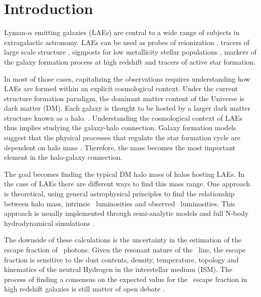 \documentclass{emulateapj}
\newcommand{\ly}{{\ifmmode{{\rm Ly}\alpha}\else{Ly$\alpha$}\fi}}
\begin{document}
\section{Introduction}
\label{sec:introduction}

Lyman-$\alpha$ emitting galaxies (LAEs) are central to a wide range
of subjects in extragalactic astronomy. 
LAEs can be used as probes of reionization \citep[for a recent review
  see][and references therein]{Dijkstra14}, tracers  of large scale structure
\citep{Koehler2007}, signposts for low metallicity stellar
populations \citep[for a recent review see][and references
  therein]{Hayes15}, markers of the galaxy formation process at high
redshift \citep{Partridge67,Rhoads00,Blanc11} and tracers of active
star formation.    

In most of those cases, capitalizing the observations requires
understanding how LAEs are formed within an explicit cosmological
context.  
Under the current structure formation paradigm, the dominant matter
content of the Universe is dark matter (DM).  
Each galaxy is thought to be hosted by a larger dark matter structure
known as a halo. \citep{Peebles1980,SpringelNature05}.  
Understanding the cosmological context of LAEs thus implies studying
the galaxy-halo connection.  
Galaxy formation models suggest that the physical processes that
regulate the star formation cycle are dependent on halo mass
\citep[e.g.][]{Behroozi2013a}. Therefore, the mass becomes 
the most important element in the halo-galaxy connection.  

The goal becomes finding the typical DM halo mass of halos hosting LAEs.
In the case of LAEs there are different ways to find this mass range.
One approach is theoretical, using general astrophysical principles to
find the relationship between halo mass, intrinsic \ly\ luminosities
and observed \ly\ luminosities. 
This approach is usually implemented through semi-analytic models
\citep{Garel2012,Orsi2012} and  full N-body hydrodynamical simulations
\citep{Laursen2007, Dayal2009, ForeroRomero2011, Yajima2012}.  

The downside of these calculations is the uncertainty in the
estimation of the escape fraction of \ly\ photons. 
Given the resonant nature of the \ly\ line, the escape fraction is
sensitive to  the dust contents, density, temperature, topology and
kinematics of the neutral Hydrogen in the interstellar medium (ISM). 
The process of finding a consensus on the expected value for the
\ly\ escape fraction in high redshift galaxies is still matter of open
debate
\citep{Neufeld1991,Verhamme2006,ForeroRomero2012,Dijkstra2012,Laursen2013,Orsi2012,Yajima14}.       
\end{document}
